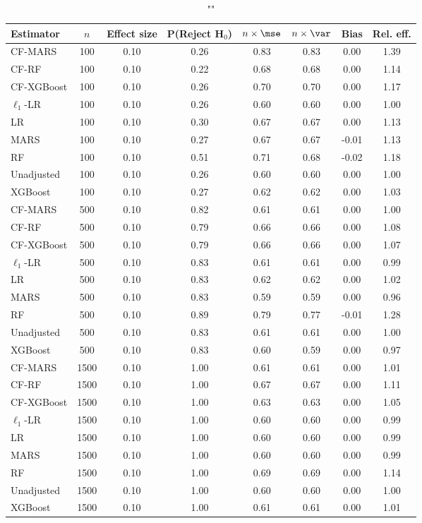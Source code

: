 \begin{table}
\centering
\caption{""}
\begin{tabular}{lccccccc}
\toprule
Estimator & $n$ & Effect size & P(Reject H$_0$) & $n\times\mse$ & $n\times \var$ & Bias & Rel. eff.\\ \midrule
CF-MARS & 100 & 0.10 & 0.26 & 0.83 & 0.83 &  0.00 & 1.39 \\ 
CF-RF & 100 & 0.10 & 0.22 & 0.68 & 0.68 &  0.00 & 1.14 \\ 
CF-XGBoost & 100 & 0.10 & 0.26 & 0.70 & 0.70 &  0.00 & 1.17 \\ 
$\ell_1$-LR & 100 & 0.10 & 0.26 & 0.60 & 0.60 &  0.00 & 1.00 \\ 
LR & 100 & 0.10 & 0.30 & 0.67 & 0.67 &  0.00 & 1.13 \\ 
MARS & 100 & 0.10 & 0.27 & 0.67 & 0.67 & -0.01 & 1.13 \\ 
RF & 100 & 0.10 & 0.51 & 0.71 & 0.68 & -0.02 & 1.18 \\ 
Unadjusted & 100 & 0.10 & 0.26 & 0.60 & 0.60 &  0.00 & 1.00 \\ 
XGBoost & 100 & 0.10 & 0.27 & 0.62 & 0.62 &  0.00 & 1.03 \\ \addlinespace 
CF-MARS & 500 & 0.10 & 0.82 & 0.61 & 0.61 &  0.00 & 1.00 \\ 
CF-RF & 500 & 0.10 & 0.79 & 0.66 & 0.66 &  0.00 & 1.08 \\ 
CF-XGBoost & 500 & 0.10 & 0.79 & 0.66 & 0.66 &  0.00 & 1.07 \\ 
$\ell_1$-LR & 500 & 0.10 & 0.83 & 0.61 & 0.61 &  0.00 & 0.99 \\ 
LR & 500 & 0.10 & 0.83 & 0.62 & 0.62 &  0.00 & 1.02 \\ 
MARS & 500 & 0.10 & 0.83 & 0.59 & 0.59 &  0.00 & 0.96 \\ 
RF & 500 & 0.10 & 0.89 & 0.79 & 0.77 & -0.01 & 1.28 \\ 
Unadjusted & 500 & 0.10 & 0.83 & 0.61 & 0.61 &  0.00 & 1.00 \\ 
XGBoost & 500 & 0.10 & 0.83 & 0.60 & 0.59 &  0.00 & 0.97 \\ \addlinespace 
CF-MARS & 1500 & 0.10 & 1.00 & 0.61 & 0.61 &  0.00 & 1.01 \\ 
CF-RF & 1500 & 0.10 & 1.00 & 0.67 & 0.67 &  0.00 & 1.11 \\ 
CF-XGBoost & 1500 & 0.10 & 1.00 & 0.63 & 0.63 &  0.00 & 1.05 \\ 
$\ell_1$-LR & 1500 & 0.10 & 1.00 & 0.60 & 0.60 &  0.00 & 0.99 \\ 
LR & 1500 & 0.10 & 1.00 & 0.60 & 0.60 &  0.00 & 0.99 \\ 
MARS & 1500 & 0.10 & 1.00 & 0.60 & 0.60 &  0.00 & 0.99 \\ 
RF & 1500 & 0.10 & 1.00 & 0.69 & 0.69 &  0.00 & 1.14 \\ 
Unadjusted & 1500 & 0.10 & 1.00 & 0.60 & 0.60 &  0.00 & 1.00 \\ 
XGBoost & 1500 & 0.10 & 1.00 & 0.61 & 0.61 &  0.00 & 1.01 \\
\bottomrule
\end{tabular}
\end{table}

